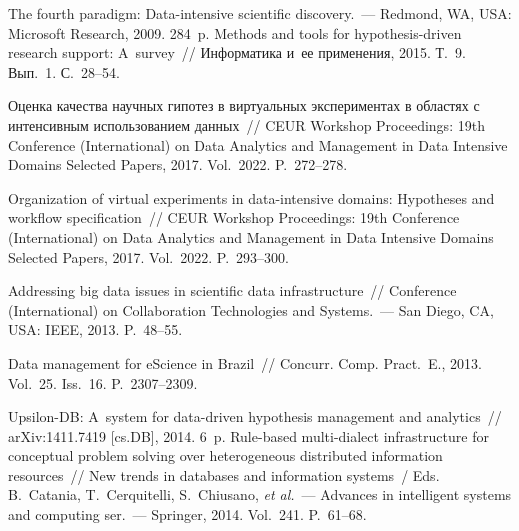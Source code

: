  \begin{multicols}{2}

\renewcommand{\bibname}{\protect\rmfamily Литература}

{\small\frenchspacing
{\baselineskip=10.5pt
\begin{thebibliography}{99}

   The fourth paradigm: Data-intensive scientific  
discovery.~--- Redmond, WA, USA: Microsoft Research, 2009. 284~p.
   Methods and tools for
   hypothesis-driven research support: A~survey~// Информатика и~ее применения, 2015. Т.~9. Вып.~1. 
С.~28--54.

   Оценка качества научных гипотез в виртуальных 
экспериментах в областях с интенсивным использованием данных~// CEUR Workshop 
Proceedings:  19th Conference (International) on Data 
Analytics and Management in Data Intensive Domains
Selected Papers, 2017. Vol.~2022. P.~272--278.

   Organization of virtual experiments in  
data-intensive domains: Hypotheses and workflow specification~//
 CEUR Workshop Proceedings: 19th Conference (International)  on Data Analytics and 
Management in Data Intensive Domains Selected Papers, 2017.  Vol.~2022. P.~293--300.
  
   Addressing big data issues in scientific 
data infrastructure~// Conference (International) on Collaboration Technologies and Systems.~---
San Diego, CA, USA: IEEE, 2013. P.~48--55.

   Data management for eScience in Brazil~// Concurr.  
Comp. Pract.~E., 2013. Vol.~25. Iss.~16. P.~2307--2309.



   Upsilon-DB: A~system for data-driven hypothesis 
management and analytics~// arXiv:1411.7419 [cs.DB], 2014. 6~p.
   Rule-based multi-dialect 
infrastructure for conceptual problem solving over heterogeneous distributed information 
resources~//  New trends in 
databases and information systems~/
Eds. B.~Catania, T.~Cerquitelli, S.~Chiusano, \textit{et al.}~---
Advances in intelligent systems and computing ser.~---
Springer, 2014. Vol.~241.  P.~61--68.


\end{thebibliography}}}
\end{multicols}
